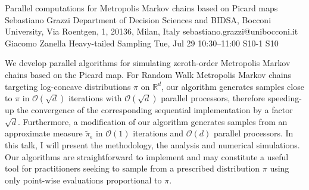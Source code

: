 \begin{talk}
  {Parallel computations for Metropolis Markov chains based on Picard maps}%
  {Sebastiano Grazzi}%
  {Department of Decision Sciences and BIDSA, Bocconi University, Via Roentgen, 1, 20136, Milan, Italy}%
  {sebastiano.grazzi@unibocconi.it}%
  {Giacomo Zanella}%
  {Heavy-tailed Sampling}%
  {Tue, Jul 29 10:30--11:00}%
  {S10-1}%
  {S10}%
    
   

 We develop parallel algorithms for simulating zeroth-order Metropolis Markov chains based on the Picard map. 
For Random Walk Metropolis Markov chains targeting log-concave distributions $\pi$ on $\mathbb{R}^d$, our algorithm  
generates samples %
close to $\pi$ %
in $\mathcal{O}(\sqrt{d})$ iterations with $\mathcal{O}(\sqrt{d})$ parallel processors, 
therefore speeding-up the convergence of the corresponding sequential implementation by a factor $\sqrt{d}$. Furthermore, a modification of our algorithm generates samples from an approximate measure $\tilde \pi_\epsilon$ in $\mathcal{O}(1)$ iterations and $\mathcal{O}(d)$ parallel processors. In this talk, I will present the methodology, the analysis and numerical simulations. Our algorithms are straightforward to implement and may constitute a useful tool for practitioners seeking to sample from a prescribed distribution $\pi$ using only point-wise evaluations proportional to $\pi$.
\end{talk}


